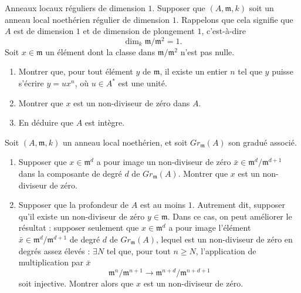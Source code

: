 \begin{exercise}
\label{exercise-regular-local-dim-1}
Anneaux locaux réguliers de dimension $1$.
Supposer que $(A, {\mathfrak m}, k)$ soit un anneau local noethérien régulier de
dimension $1$. Rappelons que cela signifie que $A$ est de dimension $1$
et de dimension de plongement $1$, c'est-à-dire
$$
\dim_k {\mathfrak m}/{\mathfrak m}^2 = 1.
$$
Soit $x\in{\mathfrak m}$ un élément dont la classe dans ${\mathfrak m}/{\mathfrak
m}^2$ n'est pas nulle.
\begin{enumerate}
\item Montrer que, pour tout élément $y$
de ${\mathfrak m}$, il existe un entier $n$ tel que $y$ puisse s'écrire
$y = ux^n$, où $u\in A^\ast$ est une unité.
\item Montrer que $x$ est un non-diviseur de zéro dans $A$.
\item En déduire que $A$ est intègre.
\end{enumerate}
\end{exercise}

\begin{exercise}
\label{exercise-nonzerodivisor-graded}
Soit $(A, {\mathfrak m}, k)$ un anneau local noethérien, et soit
$Gr_{\mathfrak m}(A)$ son gradué associé.
\begin{enumerate}
\item Supposer que $x\in {\mathfrak m}^d$ a pour image un non-diviseur de zéro
$\bar x \in {\mathfrak m}^d/{\mathfrak m}^{d + 1}$ dans la composante de degré $d$ de
$Gr_{\mathfrak m}(A)$.
Montrer que $x$ est un non-diviseur de zéro.
\item Supposer que la profondeur de $A$ est au moins $1$.
Autrement dit, supposer qu'il existe un non-diviseur de zéro $y \in {\mathfrak m}$.
Dans ce cas, on peut améliorer le résultat : supposer seulement que $x\in {\mathfrak m}^d$ a pour image
l'élément $\bar x \in {\mathfrak m}^d/{\mathfrak m}^{d + 1}$ de degré $d$
de $Gr_{\mathfrak m}(A)$, lequel est un non-diviseur de zéro en degrés assez
élevés : $\exists N$ tel que, pour tout $n \geq N$, l'application
de multiplication par $\bar x$
$$
{\mathfrak m}^n/{\mathfrak m}^{n + 1} \longrightarrow
{\mathfrak m}^{n + d}/{\mathfrak m}^{n + d + 1}
$$
soit injective. Montrer alors que $x$ est un non-diviseur de zéro.
\end{enumerate}
\end{exercise}


